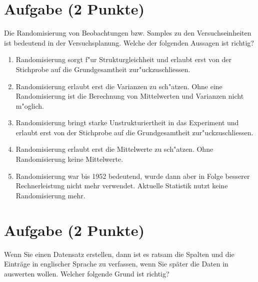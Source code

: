 \documentclass[a4paper, 10pt]{scrartcl}\usepackage[]{graphicx}\usepackage[]{xcolor}
\begin{document}
\section{Aufgabe \hfill (2 Punkte)}

Die Randomisierung von Beobachtungen bzw. Samples zu den Versuchseinheiten
ist bedeutend in der Versuchsplanung. Welche der folgenden Aussagen ist richtig?



\begin{enumerate}
\item [\textbf{A} \msquare] Randomisierung sorgt f{"u}r Strukturgleichheit und erlaubt erst von der Stichprobe auf die Grundgesamtheit zur{"u}ckzuschliessen.
\item [\textbf{B} \msquare] Randomisierung erlaubt erst die Varianzen zu sch{"a}tzen. Ohne eine Randomisierung ist die Berechnung von Mittelwerten und Varianzen nicht m{"o}glich.
\item [\textbf{C} \msquare] Randomisierung bringt starke Unstrukturiertheit in das Experiment und erlaubt erst von der Stichprobe auf die Grundgesamtheit zur{"u}ckzuschliessen.
\item [\textbf{D} \msquare] Randomisierung erlaubt erst die Mittelwerte zu sch{"a}tzen. Ohne Randomisierung keine Mittelwerte.
\item [\textbf{E} \msquare] Randomisierung war bis 1952 bedeutend, wurde dann aber in Folge besserer Rechnerleistung nicht mehr verwendet. Aktuelle Statistik nutzt keine Randomisierung mehr.
\end{enumerate}

\section{Aufgabe \hfill (2 Punkte)}

Wenn Sie einen Datensatz erstellen, dann ist es ratsam die Spalten und die
Eintr{\"a}ge in englischer Sprache zu verfassen, wenn Sie sp{\"a}ter die Daten in
\Rlogo auswerten wollen. Welcher folgende Grund ist richtig?
\end{document}
